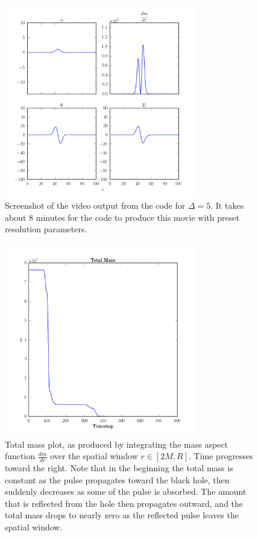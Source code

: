 \documentclass[12pt]{article}
\numberwithin{equation}{section}
\begin{document}
\begin{figure}
	\centering
	\includegraphics[width=0.75\textwidth]{video_output.png}
	\caption{Screenshot of the video output from the code for $\Delta = 5$.  It takes about 8 minutes for the code to produce this movie with preset resolution parameters.}
\end{figure}

\begin{figure}
	\centering
	\includegraphics[width=0.75\textwidth]{total_mass_d5.png}
	\caption{Total mass plot, as produced by integrating the mass aspect function $\frac{d m}{d r}$ over the spatial window $r \in [2M, R]$.  Time progresses toward the right.  Note that in the beginning the total mass is constant as the pulse propagates toward the black hole, then suddenly decreases as some of the pulse is absorbed.  The amount that is reflected from the hole then propagates outward, and the total mass drops to nearly zero as the reflected pulse leaves the spatial window.}
\end{figure} 
\end{document}
